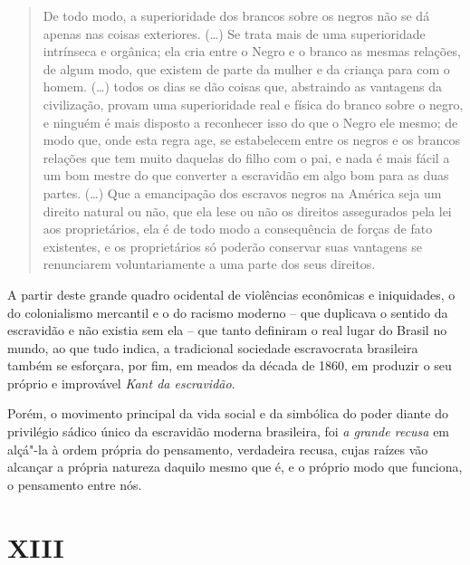 \begin{quote}
De todo modo, a superioridade dos brancos sobre os negros não se dá
apenas nas coisas exteriores. (\ldots{}) Se trata mais de uma superioridade
intrínseca e orgânica; ela cria entre o Negro e o branco as mesmas
relações, de algum modo, que existem de parte da mulher e da criança
para com o homem. (\ldots{}) todos os dias se dão coisas que, abstraindo as
vantagens da civilização, provam uma superioridade real e física do
branco sobre o negro, e ninguém é mais disposto a reconhecer isso do que
o Negro ele mesmo; de modo que, onde esta regra age, se estabelecem
entre os negros e os brancos relações que tem muito daquelas do filho
com o pai, e nada é mais fácil a um bom mestre do que converter a
escravidão em algo bom para as duas partes. (\ldots{}) Que a emancipação dos
escravos negros na América seja um direito natural ou não, que ela lese
ou não os direitos assegurados pela lei aos proprietários, ela é de todo
modo a consequência de forças de fato existentes, e os proprietários só
poderão conservar suas vantagens se renunciarem voluntariamente a uma
parte dos seus direitos.
\end{quote}

A partir deste grande quadro ocidental de violências econômicas e
iniquidades, o do colonialismo mercantil e o do racismo moderno -- que
duplicava o sentido da escravidão e não existia sem ela -- que tanto
definiram o real lugar do Brasil no mundo, ao que tudo indica, a
tradicional sociedade escravocrata brasileira também se esforçara, por
fim, em meados da década de 1860, em produzir o seu próprio e improvável
\emph{Kant da escravidão}.

Porém, o movimento principal da vida social e da simbólica do poder
diante do privilégio sádico único da escravidão moderna brasileira, foi
\emph{a grande recusa} em alçá"-la à ordem própria do pensamento\emph{,}
verdadeira recusa, cujas raízes vão alcançar a própria natureza daquilo
mesmo que é, e o próprio modo que funciona, o pensamento entre nós.

\section{XIII}

